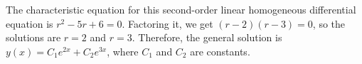 The characteristic equation for this second-order linear homogeneous differential equation is $r^2 - 5r + 6 = 0$. Factoring it, we get $(r - 2)(r - 3) = 0$, so the solutions are $r = 2$ and $r = 3$. Therefore, the general solution is $y(x) = C_1e^{2x} + C_2e^{3x}$, where $C_1$ and $C_2$ are constants.
